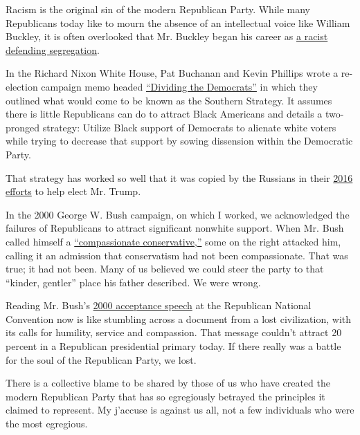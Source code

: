Racism is the original sin of the modern Republican Party. While many
Republicans today like to mourn the absence of an intellectual voice
like William Buckley, it is often overlooked that Mr. Buckley began his
career as
\href{https://www.politico.com/magazine/story/2017/05/13/william-f-buckley-civil-rights-215129}{a
racist defending segregation}.

In the Richard Nixon White House, Pat Buchanan and Kevin Phillips wrote
a re-election campaign memo headed
\href{https://www.cnn.com/2010/POLITICS/01/11/nixon.racial.strategy/index.html}{``Dividing
the Democrats''} in which they outlined what would come to be known as
the Southern Strategy. It assumes there is little Republicans can do to
attract Black Americans and details a two-pronged strategy: Utilize
Black support of Democrats to alienate white voters while trying to
decrease that support by sowing dissension within the Democratic Party.

That strategy has worked so well that it was copied by the Russians in
their
\href{https://www.nytimes.com/2019/04/18/us/politics/the-mueller-report-excerpts.html}{2016
efforts} to help elect Mr. Trump.

In the 2000 George W. Bush campaign, on which I worked, we acknowledged
the failures of Republicans to attract significant nonwhite support.
When Mr. Bush called himself a
\href{https://www.nytimes.com/2000/06/12/us/bush-draws-campaign-theme-from-more-than-the-heart.html}{``compassionate
conservative,''} some on the right attacked him, calling it an admission
that conservatism had not been compassionate. That was true; it had not
been. Many of us believed we could steer the party to that ``kinder,
gentler'' place his father described. We were wrong.

Reading Mr. Bush's
\href{http://movies2.nytimes.com/library/politics/camp/080400wh-bush-speech.html}{2000
acceptance speech} at the Republican National Convention now is like
stumbling across a document from a lost civilization, with its calls for
humility, service and compassion. That message couldn't attract 20
percent in a Republican presidential primary today. If there really was
a battle for the soul of the Republican Party, we lost.

There is a collective blame to be shared by those of us who have created
the modern Republican Party that has so egregiously betrayed the
principles it claimed to represent. My j'accuse is against us all, not a
few individuals who were the most egregious.

